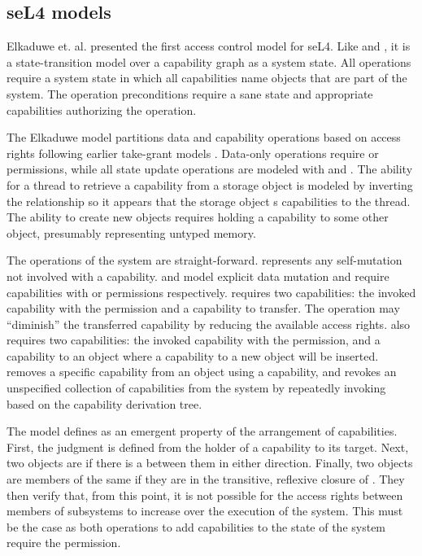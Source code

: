 \subsection{seL4 models}
\label{sect:sel4:models}


Elkaduwe et. al. presented the first access control model for seL4. \cite{seL4:Verified} \cite{Elkaduwe:Thesis}
Like \TMSW{} and \TMmodelName{}, it is a state-transition model over a capability graph as a system state.
All operations require a  system state in which all capabilities name objects that are part of the system.
The operation preconditions require a sane state and appropriate capabilities authorizing the operation.

The Elkaduwe model partitions data and capability operations based on access rights following earlier take-grant models \cite{LiptonSnyder:LinearSecurity} \cite{Snyder:1977:SAP}.
Data-only operations require  or  permissions, while all state update operations are modeled with  and .
The ability for a thread to retrieve a capability from a storage object is modeled by inverting the relationship so it appears that the storage object s capabilities to the thread.
The ability to create new objects requires holding a  capability to some other object, presumably representing untyped memory.

The operations of the system are straight-forward.
 represents any self-mutation not involved with a capability.
 and  model explicit data mutation and require capabilities with  or  permissions respectively.
 requires two capabilities: the invoked capability with the  permission and a capability to transfer.
The  operation may ``diminish'' the transferred capability by reducing the available access rights.
 also requires two capabilities: the invoked capability with the  permission, and a  capability to an object where a capability to a new object will be inserted.
 removes a specific capability from an object using a capability, and  revokes an unspecified collection of capabilities from the system by repeatedly invoking  based on the capability derivation tree.

The model defines  as an emergent property of the arrangement of capabilities.
First, the  judgment is defined from the holder of a  capability to its target.
Next, two objects are  if there is a  between them in either direction.
Finally, two objects are members of the same  if they are in the transitive, reflexive closure of .
They then verify that, from this point, it is not possible for the access rights between members of subsystems to increase over the execution of the system.
This must be the case as both operations to add capabilities to the state of the system require the  permission.

